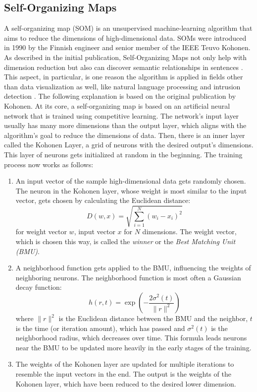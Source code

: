 \subsection{Self-Organizing Maps}
\label{subsec:self-organizing_maps}
A self-organizing map (SOM) is an unsupervised machine-learning algorithm that aims to reduce the dimensions of high-dimensional data. SOMs were introduced in 1990 by the Finnish engineer and senior member of the IEEE Teuvo Kohonen. As described in the initial publication, Self-Organizing Maps not only help with dimension reduction but also can discover semantic relationships in sentences \cite{Kohonen1990}.
This aspect, in particular, is one reason the algorithm is applied in fields other than data visualization as well, like natural language processing and intrusion detection \cite{qu2021survey}. The following explanation is based on the original publication by Kohonen. At its core, a self-organizing map is based on an artificial neural network that is trained using competitive learning. The network's input layer usually has many more dimensions than the output layer, which aligns with the algorithm's goal to reduce the dimensions of data. Then, there is an inner layer called the Kohonen Layer, a grid of neurons with the desired output's dimensions. This layer of neurons gets initialized at random in the beginning. The training process now works as follows:

\begin{enumerate}
	\item An input vector of the sample high-dimensional data gets randomly chosen. The neuron in the Kohonen layer, whose weight is most similar to the input vector, gets chosen by calculating the Euclidean distance: $$D(w, x) = \sqrt{\sum_{i=1}^{N} (w_i - x_i)^2}$$ for weight vector $w$, input vector $x$ for $N$ dimensions. The weight vector, which is chosen this way, is called the \emph{winner} or the \emph{Best Matching Unit (BMU)}.
	\item A neighborhood function gets applied to the BMU, influencing the weights of neighboring neurons. The neighborhood function is most often a Gaussian decay function: $$h(r, t) = \exp\left(-\frac{2\sigma^2(t)}{\|r\|^2}\right)$$ where $\|r\|^2$ is the Euclidean distance between the BMU and the neighbor, $t$ is the time (or iteration amount), which has passed and $\sigma^2(t)$ is the neighborhood radius, which decreases over time. This formula leads neurons near the BMU to be updated more heavily in the early stages of the training.
	\item The weights of the Kohonen layer are updated for multiple iterations to resemble the input vectors in the end. The output is the weights of the Kohonen layer, which have been reduced to the desired lower dimension.
\end{enumerate}

